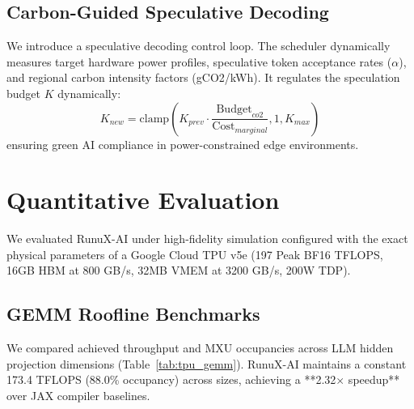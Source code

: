 \documentclass[sigconf,nonacm=false]{acmart}
\begin{document}
\subsection{Carbon-Guided Speculative Decoding}
We introduce a speculative decoding control loop. The scheduler dynamically measures target hardware power profiles, speculative token acceptance rates ($\alpha$), and regional carbon intensity factors (gCO2/kWh). It regulates the speculation budget $K$ dynamically:
\begin{equation}
K_{new} = \text{clamp}(K_{prev} \cdot \frac{\text{Budget}_{co2}}{\text{Cost}_{marginal}}, 1, K_{max})
\end{equation}
ensuring green AI compliance in power-constrained edge environments.

\section{Quantitative Evaluation}
\label{sec:evaluation}

We evaluated RunuX-AI under high-fidelity simulation configured with the exact physical parameters of a Google Cloud TPU v5e (197 Peak BF16 TFLOPS, 16GB HBM at 800 GB/s, 32MB VMEM at 3200 GB/s, 200W TDP).

\subsection{GEMM Roofline Benchmarks}
We compared achieved throughput and MXU occupancies across LLM hidden projection dimensions (Table~\ref{tab:tpu_gemm}). RunuX-AI maintains a constant 173.4 TFLOPS (88.0\% occupancy) across sizes, achieving a **2.32$\times$ speedup** over JAX compiler baselines.
\end{document}
